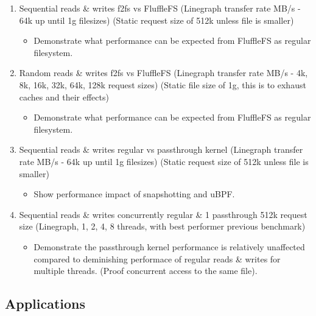 \begin{enumerate}
    \item Sequential reads \& writes f2fs vs FluffleFS
    (Linegraph transfer rate MB/s - 64k up until 1g filesizes)
    (Static request size of 512k unless file is smaller)
    \begin{itemize}
        \item Demonstrate what performance can be expected from FluffleFS as
              regular filesystem.
    \end{itemize}
    \item Random reads \& writes f2fs vs FluffleFS
    (Linegraph transfer rate MB/s - 4k, 8k, 16k, 32k, 64k, 128k request sizes)
    (Static file size of 1g, this is to exhaust caches and their effects)
    \begin{itemize}
        \item Demonstrate what performance can be expected from FluffleFS as
              regular filesystem.
    \end{itemize}
    \item Sequential reads \& writes regular vs passthrough kernel
    (Linegraph transfer rate MB/s - 64k up until 1g filesizes)
    (Static request size of 512k unless file is smaller)
    \begin{itemize}
        \item Show performance impact of snapshotting and uBPF.
    \end{itemize}
    \item Sequential reads \& writes concurrently regular \& 1 passthrough 512k
    request size
    (Linegraph, 1, 2, 4, 8 threads, with best performer previous benchmark)
    \begin{itemize}
        \item Demonstrate the passthrough kernel performance is relatively
              unaffected compared to deminishing performace of regular reads
              \& writes for multiple threads. (Proof concurrent access to the
              same file).
    \end{itemize}
\end{enumerate}

\subsection{Applications}

